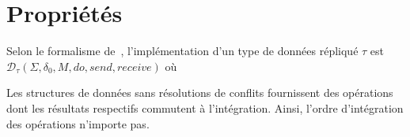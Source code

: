 
\section{Propriétés}
\label{crdts:sec:properties}

Selon le formalisme de~\cite{burckhardt2014replicated}, l'implémentation d'un
type de données répliqué $\tau$ est\\
$\mathcal{D}_\tau(\Sigma, \delta_0, M, do, send, receive)$ où 

Les structures de données sans résolutions de conflits
fournissent des opérations dont les résultats respectifs commutent à
l'intégration. Ainsi, l'ordre d'intégration des opérations n'importe pas.

